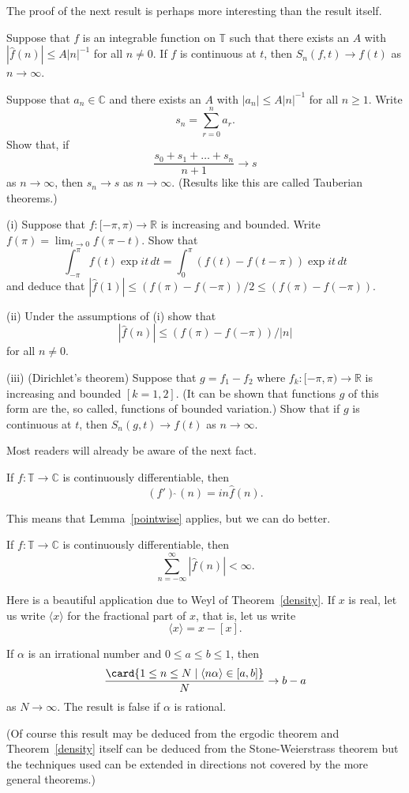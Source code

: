 The proof of the next result is perhaps more interesting
than the result itself.
\begin{lemma}\label{pointwise}
Suppose that $f$ is an
integrable function on ${\mathbb T}$ such that there
exists an $A$ with $|\hat{f}(n)|\leq A|n|^{-1}$ for
all $n\neq 0$. If $f$ is continuous at $t$, then
$S_{n}(f,t)\rightarrow f(t)$ as $n\rightarrow\infty$.
\end{lemma}
\begin{exercise} Suppose that $a_{n}\in{\mathbb C}$
and there
exists an $A$ with $|a_{n}|\leq A|n|^{-1}$ for
all $n\geq 1$. Write
\[s_{n}=\sum_{r=0}^{n}a_{r}.\]
Show that, if
\[\frac{s_{0}+s_{1}+\dots+s_{n}}{n+1}\rightarrow s\]
as $n\rightarrow\infty$, then $s_{n}\rightarrow s$
as $n\rightarrow\infty$. (Results like this are
called Tauberian theorems.)

\end{exercise}
\begin{exercise} (i)
Suppose that $f:[-\pi,\pi)\rightarrow{\mathbb R}$
is increasing and bounded. Write $f(\pi)=\lim_{t\rightarrow 0}
f(\pi -t)$.
Show that
\[\int_{-\pi}^{\pi}f(t)\exp it\, dt=
\int_{0}^{\pi}(f(t)-f(t-\pi))\exp it\, dt\]
and deduce that $|\hat{f}(1)|\leq
(f(\pi)-f(-\pi))/2\leq(f(\pi)-f(-\pi))$.

(ii) Under the assumptions of (i) show that
\[|\hat{f}(n)|\leq (f(\pi)-f(-\pi))/|n|\]
for all $n\neq 0$.

(iii) (Dirichlet's theorem) Suppose that $g=f_{1}-f_{2}$
where $f_{k}:[-\pi,\pi)\rightarrow{\mathbb R}$
is increasing and bounded $[k=1,2]$. (It can be
shown that functions $g$ of this form are the,
so called, functions of bounded variation.)
Show that if $g$ is continuous at $t$, then
$S_{n}(g,t)\rightarrow f(t)$ as $n\rightarrow\infty$.
\end{exercise}

Most readers will already be aware of the next fact.
\begin{lemma} If $f:{\mathbb T}\rightarrow{\mathbb C}$
is continuously differentiable, then
\[(f')\hat{\ }(n)=in\hat{f}(n).\]
\end{lemma}
This means that Lemma~\ref{pointwise} applies,
but we can do better.
\begin{lemma}\label{once is}
If $f:{\mathbb T}\rightarrow{\mathbb C}$
is continuously differentiable, then
\[\sum_{n=-\infty}^{\infty}|\hat{f}(n)|<\infty.\]
\end{lemma}

Here is a beautiful application due to Weyl
of Theorem~\ref{density}. If $x$ is real,
let us write $\langle x\rangle$ for the fractional part
of $x$, that is, let us write
\[\langle x\rangle=x-[x].\]
\begin{theorem}\label{Weyl} If $\alpha$ is an irrational
number and $0\leq a\leq b\leq 1$, then
\[\frac{\card\{1\leq n\leq N \mid \langle n\alpha\rangle
\in [a,b]\}}{N}
\rightarrow b-a\]
as $N\rightarrow\infty$. The result is false
if $\alpha$ is rational.
\end{theorem}
(Of course this result may be deduced from the ergodic
theorem and Theorem~\ref{density} itself can be deduced
from the Stone-Weierstrass theorem but the techniques
used can be extended in directions not covered by
the more general theorems.)

